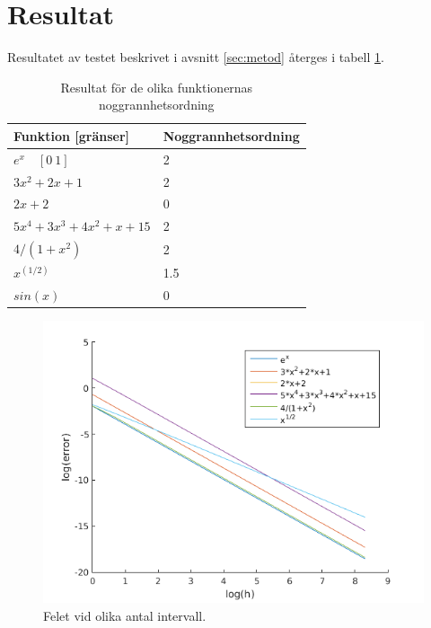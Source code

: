 \documentclass[titlepage, a4paper]{article}
\begin{document}
\section{Resultat}
Resultatet av testet beskrivet i avsnitt \ref{sec:metod} återges i tabell \ref{tab:resultat}.

\begin{table}[H]
  \centering
  \begin{tabular}{|l|l|}
    \hline
    \textbf{Funktion [gränser]} & \textbf{Noggrannhetsordning} \\ \hline
    $e^x \quad [0 \ 1]$ & 2 \\ \hline
    $3x^2+2x+1$ \quad [0 \ 1] & 2 \\ \hline
    $2x+2$ \quad [0 \ 1] & 0 \\ \hline
    $5x^4+3x^3+4x^2+x+15$ \quad [0 \ 1] & 2 \\ \hline
    $4/(1+x^2)$ \quad [0 \ 1] & 2\\ \hline
    $x^{(1/2)}$ \quad [0 \ 1] & 1.5 \\ \hline
    $sin(x)$ \quad [0 \ $2\pi$] & 0 \\ \hline
  \end{tabular}
  \caption{Resultat för de olika funktionernas noggrannhetsordning}
  \label{tab:resultat}
\end{table}

\begin{figure}[H]
  \centering
  \includegraphics[scale=0.8]{errors2.png}
  \caption{Felet vid olika antal intervall.}
  \label{fig:intervalls}
\end{figure}
\end{document}
